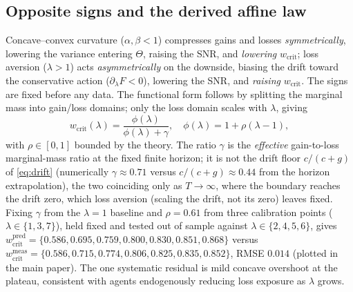 \documentclass[letterpaper]{article} %
\theoremstyle{plain}
\newcommand{\wcrit}{w_{\mathrm{crit}}}
\begin{document}
\subsection{Opposite signs and the derived affine law}
Concave--convex curvature ($\alpha,\beta<1$) compresses gains and losses \emph{symmetrically},
lowering the variance entering $\Theta$, raising the SNR, and \emph{lowering} $\wcrit$; loss
aversion ($\lambda>1$) acts \emph{asymmetrically} on the downside, biasing the drift toward the
conservative action ($\partial_\lambda F<0$), lowering the SNR, and \emph{raising}
$\wcrit$. The signs are fixed before any data. The functional form follows by splitting the
marginal mass into gain/loss domains; only the loss domain scales with $\lambda$, giving
\begin{equation}
 \wcrit(\lambda)=\frac{\phi(\lambda)}{\phi(\lambda)+\gamma},\quad\phi(\lambda)=1+\rho(\lambda-1),
 \label{eq:wcrit_lambda}
\end{equation}
with $\rho\in[0,1]$ bounded by the theory. The ratio $\gamma$ is the \emph{effective}
gain-to-loss marginal-mass ratio at the fixed finite horizon; it is not the drift floor
$c/(c+g)$ of \eqref{eq:drift} (numerically $\gamma\approx0.71$ versus $c/(c+g)\approx0.44$ from the
horizon extrapolation), the two coinciding only as $T\to\infty$, where the boundary reaches the
drift zero, which loss aversion (scaling the drift, not its zero) leaves fixed. Fixing $\gamma$ from the
$\lambda{=}1$ baseline and $\rho=0.61$ from three calibration points ($\lambda\in\{1,3,7\}$), held
fixed and tested out of sample against $\lambda\in\{2,4,5,6\}$, gives
$\wcrit^{\text{pred}}=\{0.586,0.695,0.759,0.800,0.830,0.851,0.868\}$ versus
$\wcrit^{\text{meas}}=\{0.586,0.715,0.774,0.806,0.825,0.835,0.852\}$, RMSE $0.014$ (plotted in
the main paper). The one systematic residual is mild concave overshoot at the plateau,
consistent with agents endogenously reducing loss exposure as $\lambda$ grows.
\end{document}
